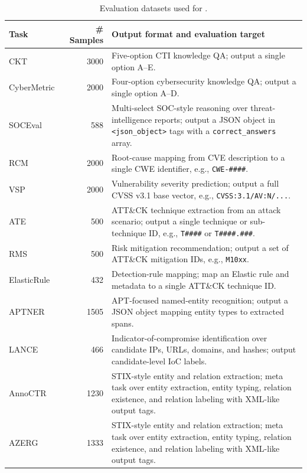 \begin{table}[t]
\centering
\small
\setlength{\tabcolsep}{4pt}
\renewcommand{\arraystretch}{1.12}
\caption{Evaluation datasets used for .}
\label{tab:eval-datasets}
\begin{tabular}{p{3.0cm} r p{8.4cm}}
\toprule
Task & \# Samples & Output format and evaluation target \\
\midrule
CKT~\citep{alam2025athenabench}
& 3000
& Five-option CTI knowledge QA; output a single option A--E. \\

CyberMetric~\citep{cybermetric}
& 2000
& Four-option cybersecurity knowledge QA; output a single option A--D. \\

SOCEval~\citep{deason2025cybersoceval}
& 588
& Multi-select SOC-style reasoning over threat-intelligence reports; output a JSON object in \texttt{<json\_object>} tags with a \texttt{correct\_answers} array. \\

RCM~\citep{alam2025athenabench}
& 2000
& Root-cause mapping from CVE description to a single CWE identifier, e.g., \texttt{CWE-\#\#\#\#}. \\

VSP~\citep{alam2025athenabench}
& 2000
& Vulnerability severity prediction; output a full CVSS v3.1 base vector, e.g., \texttt{CVSS:3.1/AV:N/...}. \\

ATE~\citep{alam2025athenabench}
& 500
& ATT\&CK technique extraction from an attack scenario; output a single technique or sub-technique ID, e.g., \texttt{T\#\#\#\#} or \texttt{T\#\#\#\#.\#\#\#}. \\

RMS~\citep{alam2025athenabench}
& 500
& Risk mitigation recommendation; output a set of ATT\&CK mitigation IDs, e.g., \texttt{M10xx}. \\

ElasticRule~\citep{elastic_detection_rules}
& 432
& Detection-rule mapping; map an Elastic rule and metadata to a single ATT\&CK technique ID. \\

APTNER~\citep{wang2022aptner}
& 1505
& APT-focused named-entity recognition; output a JSON object mapping entity types to extracted spans. \\

LANCE~\citep{froudakis2025revealing}
& 466
& Indicator-of-compromise identification over candidate IPs, URLs, domains, and hashes; output candidate-level IoC labels. \\

AnnoCTR~\citep{lange2024annoctr}
& 1230
& STIX-style entity and relation extraction; meta task over entity extraction, entity typing, relation existence, and relation labeling with XML-like output tags. \\

AZERG~\citep{lekssays2025text}
& 1333
& STIX-style entity and relation extraction; meta task over entity extraction, entity typing, relation existence, and relation labeling with XML-like output tags. \\
\bottomrule
\end{tabular}
\end{table}
\FloatBarrier
